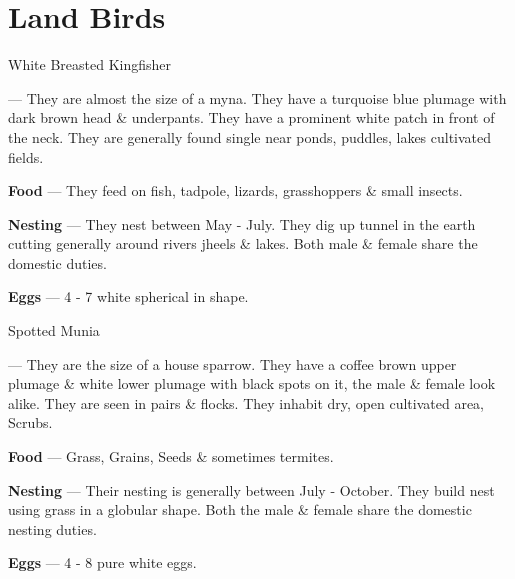 \part{Land Birds}

\begin{bird}{White Breasted Kingfisher}

 --- They are almost the size of a myna. They have a turquoise blue plumage with dark brown head \& underpants. They  have a prominent white patch in front of the neck. They are generally found single near ponds, puddles, lakes cultivated fields.

{\large\bf Food} --- They feed on fish, tadpole, lizards, grasshoppers \& small insects.

{\large\bf Nesting} --- They nest between May - July. They dig up tunnel in the earth cutting generally around rivers jheels \& lakes. Both male \& female share the domestic duties.

{\large\bf Eggs} --- 4 - 7 white spherical in shape.
\end{bird}

\begin{bird}{Spotted Munia}

 --- They are the size of a house sparrow. They have a coffee brown upper plumage \& white lower plumage with black spots on it, the male \& female look alike. They are seen in pairs \& flocks. They inhabit dry, open cultivated area, Scrubs. 

{\large\bf Food} --- Grass, Grains, Seeds \& sometimes termites.

{\large\bf Nesting} --- Their nesting is generally between July - October. They build nest using grass in a globular shape. Both the male \& female share the domestic nesting duties.

{\large\bf Eggs} --- 4 - 8 pure white eggs.
\end{bird}

